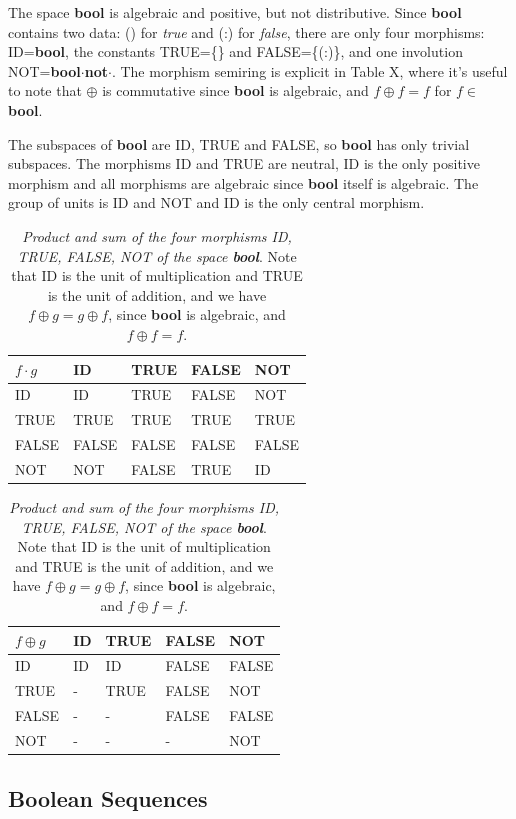 \documentclass[11pt]{article}
\begin{document}
      The space {\bf bool} is algebraic and positive, but not distributive.  Since {\bf bool} contains two data:  () for {\it true} and (:) for {\it false},   
 there are only four morphisms:  ID={\bf bool},  the constants TRUE=\{\} and FALSE=\{(:)\}, and one involution 
 NOT={\bf bool}$\cdot${\bf not}$\cdot$.  The morphism semiring is explicit in Table X, where it's useful to note that $\oplus$ is commutative since {\bf bool} is 
 algebraic, and $f\oplus f=f$ for $f\in${\bf bool}.  

The subspaces of {\bf bool} are ID, TRUE and FALSE, so {\bf bool} has only trivial subspaces.  The morphisms ID and TRUE are neutral, ID is the only positive 
morphism and all morphisms are algebraic since {\bf bool} itself is algebraic.  The group of units is ID and NOT and ID is the only central morphism. 

\begin{table}
\begin{tabular}{| l | l | l | l | l |  }
$f\cdot g$ & ID & TRUE & FALSE & NOT  \\
\hline
ID &  ID & TRUE & FALSE &  NOT \\
TRUE & TRUE & TRUE  & TRUE & TRUE \\
FALSE & FALSE  & FALSE & FALSE & FALSE   \\
NOT & NOT & FALSE & TRUE & ID \\
\hline
\end{tabular}
\begin{tabular}{| l | l | l | l | l |  }
$f\oplus g$ & ID & TRUE & FALSE & NOT  \\
\hline
ID &  ID & ID & FALSE & FALSE \\
TRUE & - & TRUE  & FALSE & NOT \\
FALSE & -  & - & FALSE & FALSE   \\
NOT & - & - & - & NOT \\
\hline
\end{tabular}
\caption{{\it Product and sum of the four morphisms ID, TRUE, FALSE, NOT of the space {\bf bool}}.  Note that ID is the unit of multiplication and TRUE is the 
unit of addition, and we have $f\oplus g=g\oplus f$, since {\bf bool} is algebraic, and $f\oplus f=f$.}
\end{table}

\subsection{Boolean Sequences}
\end{document}
